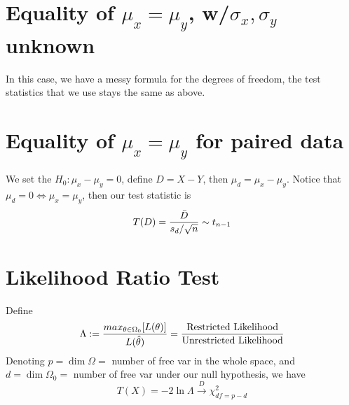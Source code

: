 \documentclass{article}
\begin{document}
\section{Equality of $\mu_x = \mu_y$, w/$\sigma_x, \sigma_y$ unknown}
In this case, we have a messy formula for the degrees of freedom, the
test statistics that we use stays the same as above.

\section{Equality of $\mu_x = \mu_y$ for paired data}
We set the $H_0: \mu_x - \mu_y = 0$, define $D = X-Y$, then $\mu_d = \mu_x - \mu_y$. Notice that $\mu_d = 0 \iff \mu_x = \mu_y$, then our test statistic is
\begin{equation*}
    T(D) = \frac{\Bar{D}}{s_d/\sqrt{n}} \sim t_{n-1}
\end{equation*}

\section{Likelihood Ratio Test}
Define
\begin{equation*}
    \Lambda := \frac{max_{\theta \in 
\Omega_0}[L(\theta)]}{L(\Hat{\theta})} = \frac{\text{Restricted Likelihood}}{\text{Unrestricted Likelihood}}
\end{equation*}
Denoting $p = \dim\Omega =$ number of free var in the whole space, and 
$d = \dim\Omega_0 =$ number of free var under our null hypothesis, we 
have
\begin{equation*}
    T(X) = -2\ln{\Lambda} \xrightarrow{D} \chi^2_{df = p-d}
\end{equation*}
\end{document}
